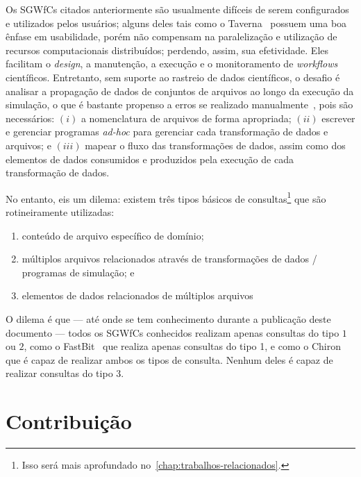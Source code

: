Os SGWfCs citados anteriormente são usualmente difíceis de serem configurados e utilizados pelos usuários; alguns deles tais como o Taverna~\cite{hull2006taverna} possuem uma boa ênfase em usabilidade, porém não compensam na paralelização e utilização de recursos computacionais distribuídos; perdendo, assim, sua efetividade.
Eles facilitam o \textit{design}, a manutenção, a execução e o monitoramento de \textit{workflows} científicos. Entretanto, sem suporte ao rastreio de dados científicos, o desafio é analisar a propagação de dados de conjuntos de arquivos ao longo da execução da simulação, o que é bastante propenso a erros se realizado manualmente~\cite{silva2015analyzing}, pois são necessários: \( (i) \) a nomenclatura de arquivos de forma apropriada; \( (ii) \) escrever e gerenciar programas \textit{ad-hoc} para gerenciar cada transformação de dados e arquivos; e \( (iii) \) mapear o fluxo das transformações de dados, assim como dos elementos de dados consumidos e produzidos pela execução de cada transformação de dados.

No entanto, eis um dilema: existem três tipos básicos de consultas\footnote{Isso será mais aprofundado no~\autoref{chap:trabalhos-relacionados}.} que são rotineiramente utilizadas:

\begin{enumerate}
    \item conteúdo de arquivo específico de domínio;
    \item múltiplos arquivos relacionados através de transformações de dados / programas de simulação; e
    \item elementos de dados relacionados de múltiplos arquivos
\end{enumerate}

O dilema é que --- até onde se tem conhecimento durante a publicação deste documento --- todos os SGWfCs conhecidos realizam apenas consultas do tipo \( 1 \) ou \( 2 \), como o FastBit~\cite{wu2009fastbit} que realiza apenas consultas do tipo 1, e como o Chiron~\cite{ogasawara2013chiron} que é capaz de realizar ambos os tipos de consulta. Nenhum deles é capaz de realizar consultas do tipo 3.

\section{Contribuição}

